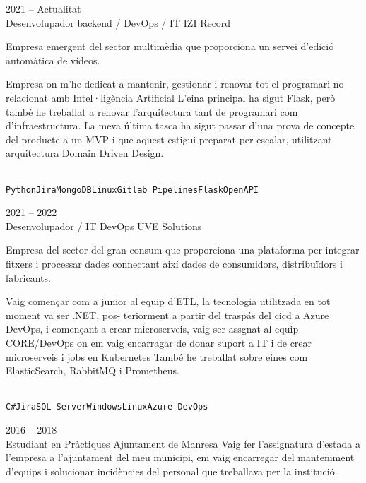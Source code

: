 \documentclass[9pt]{developercv} %
\begin{document}
\begin{entrylist}
	\entry
		{2021 -- Actualitat\\}
		{Desenvolupador backend / DevOps / IT}
		{IZI Record}
		{Empresa emergent del sector multimèdia que proporciona un servei d'edició automàtica de vídeos.

		Empresa on m'he dedicat a mantenir, gestionar i renovar tot el programari no relacionat amb Intel·ligència Artificial  L'eina principal ha sigut Flask, però també he treballat a renovar
		l'arquitectura tant de programari com d'infraestructura. La meva última tasca ha sigut passar d'una prova de concepte del producte a un MVP i que aquest estigui preparat per escalar, utilitzant arquitectura Domain Driven Design.

		\\ \texttt{Python}\slashsep\texttt{Jira}\slashsep\texttt{MongoDB}\slashsep\texttt{Linux}\slashsep\texttt{Gitlab Pipelines}\slashsep\texttt{Flask}\slashsep\texttt{OpenAPI}}

	\entry
		{2021 -- 2022\\}
		{Desenvolupador / IT DevOps}
		{UVE Solutions}
		{Empresa del sector del gran consum que proporciona una plataforma per integrar fitxers i
		processar dades connectant així dades de consumidors, distribuïdors i fabricants.

		Vaig començar com a junior al equip d’ETL, la tecnologia utilitzada en tot moment va ser .NET, pos-
		teriorment a partir del traspás del cicd a Azure DevOps, i començant a crear microserveis, vaig ser
		assgnat al equip CORE/DevOps on em vaig encarragar de donar suport a IT i de crear microserveis
		i jobs en Kubernetes
		També he treballat sobre eines com ElasticSearch, RabbitMQ i Prometheus.
		
		\\ \texttt{C\#}\slashsep\texttt{Jira}\slashsep\texttt{SQL Server}\slashsep\texttt{Windows}\slashsep\texttt{Linux}\slashsep\texttt{Azure DevOps}}

	\entry
		{2016 -- 2018\\}
		{Estudiant en Pràctiques}
		{Ajuntament de Manresa}
		{ 
			Vaig fer l'assignatura d'estada a l'empresa a l'ajuntament del meu municipi, em vaig encarregar del manteniment d'equips i solucionar incidències del personal que treballava per la institució. 
			}

\end{entrylist}

\end{document}
